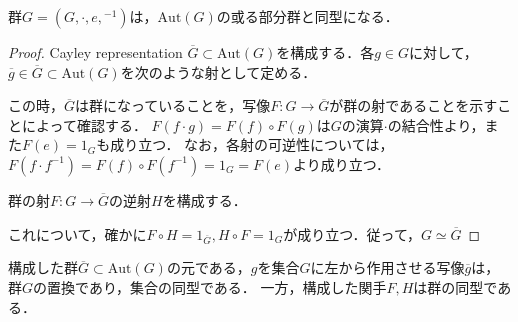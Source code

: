 \documentclass[uplatex, dvipdfmx]{jsarticle}
\begin{document}
\begin{theorem*}[Cayley]
    群$G=(G,\cdot,e,{}^{-1})$は，$\mathrm{Aut}(G)$の或る部分群と同型になる．
\end{theorem*}
\begin{proof}
    Cayley representation $\overline{G}\subset\mathrm{Aut}(G)$を構成する．各$g\in G$に対して，$\overline{g}\in\overline{G}\subset\mathrm{Aut}(G)$を次のような射として定める．
    \begin{center}\end{center}
    この時，$\overline{G}$は群になっていることを，写像$F:G\to \overline{G}$が群の射であることを示すことによって確認する．
    $F(f\cdot g)=F(f)\circ F(g)$は$G$の演算$\cdot$の結合性より，また$F(e)=1_G$も成り立つ．
    なお，各射の可逆性については，$F(f\cdot f^{-1})=F(f)\circ F(f^{-1})=1_G=F(e)$より成り立つ．

    群の射$F:G\to \overline{G}$の逆射$H$を構成する．
    \begin{center}\end{center}
    これについて，確かに$F\circ H=1_{\overline{G}}, H\circ F=1_G$が成り立つ．従って，$G\simeq \overline{G}$
\end{proof}

\begin{remark}
    構成した群$\overline{G}\subset\mathrm{Aut}(G)$の元である，$g$を集合$G$に左から作用させる写像$\overline{g}$は，群$G$の置換であり，集合の同型である．
    一方，構成した関手$F,H$は群の同型である．
\end{remark}
\end{document}
